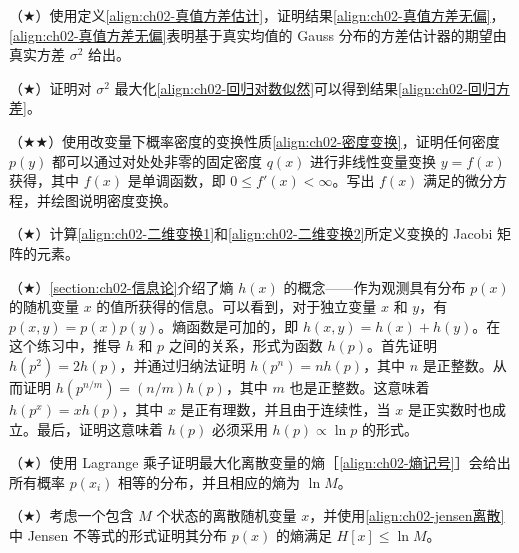 \documentclass[../../main.tex]{subfiles}
\begin{document}
\begin{exercise}\label{exercise:ch02-17}
（$\bigstar$）使用定义\eqref{align:ch02-真值方差估计}，证明结果\eqref{align:ch02-真值方差无偏}，\eqref{align:ch02-真值方差无偏}表明基于真实均值的 Gauss 分布的方差估计器的期望由真实方差 $\sigma^{2}$ 给出。
\end{exercise}

\begin{exercise}\label{exercise:ch02-18}
（$\bigstar$）证明对 $\sigma^{2}$ 最大化\eqref{align:ch02-回归对数似然}可以得到结果\eqref{align:ch02-回归方差}。
\end{exercise}

\begin{exercise}\label{exercise:ch02-19}
（$\bigstar\bigstar$）使用改变量下概率密度的变换性质\eqref{align:ch02-密度变换}，证明任何密度 $p(y)$ 都可以通过对处处非零的固定密度 $q(x)$ 进行非线性变量变换 $y=f(x)$ 获得，其中 $f(x)$ 是单调函数，即 $0\leqslant f'(x)<\infty$。写出 $f(x)$ 满足的微分方程，并绘图说明密度变换。
\end{exercise}

\begin{exercise}\label{exercise:ch02-20}
（$\bigstar$）计算\eqref{align:ch02-二维变换1}和\eqref{align:ch02-二维变换2}所定义变换的 Jacobi 矩阵的元素。
\end{exercise}

\begin{exercise}\label{exercise:ch02-21}
（$\bigstar$）\cref{section:ch02-信息论}介绍了熵 $h(x)$ 的概念——作为观测具有分布 $p(x)$ 的随机变量 $x$ 的值所获得的信息。可以看到，对于独立变量 $x$ 和 $y$，有 $p(x,y)=p(x)p(y)$。熵函数是可加的，即 $h(x,y)=h(x)+h(y)$。在这个练习中，推导 $h$ 和 $p$ 之间的关系，形式为函数 $h(p)$。首先证明 $h(p^{2})=2h(p)$，并通过归纳法证明 $h(p^{n})=nh(p)$，其中 $n$ 是正整数。从而证明 $h(p^{n/m})=(n/m)h(p)$，其中 $m$ 也是正整数。这意味着 $h(p^{x})=xh(p)$，其中 $x$ 是正有理数，并且由于连续性，当 $x$ 是正实数时也成立。最后，证明这意味着 $h(p)$ 必须采用 $h(p)\propto\ln p$ 的形式。
\end{exercise}

\begin{exercise}\label{exercise:ch02-22}
（$\bigstar$）使用 Lagrange 乘子证明最大化离散变量的熵［\eqref{align:ch02-熵记号}］会给出所有概率 $p(x_i)$ 相等的分布，并且相应的熵为 $\ln M$。
\end{exercise}

\begin{exercise}\label{exercise:ch02-23}
（$\bigstar$）考虑一个包含 $M$ 个状态的离散随机变量 $x$，并使用\eqref{align:ch02-jensen离散}中 Jensen 不等式的形式证明其分布 $p(x)$ 的熵满足 $H[x]\leqslant\ln M$。
\end{exercise}
\end{document}
